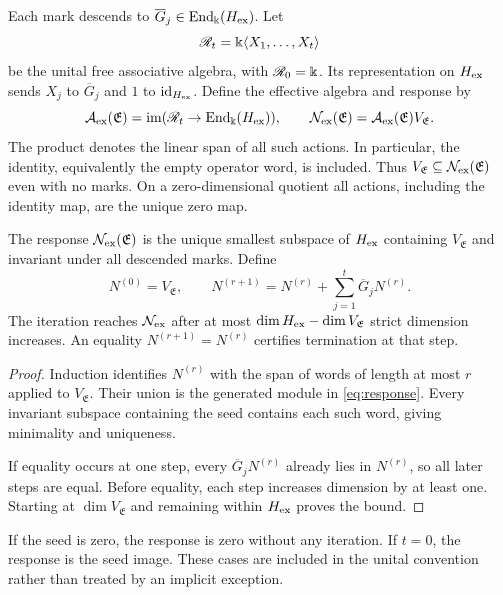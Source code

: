 \documentclass[11pt,a4paper]{article}
\begin{document}
Each mark descends to $\overline G_j\in\operatorname{End}_\Bbbk(H_{\mathrm{ex}})$.  Let
\[
 \mathscr R_t=\Bbbk\langle X_1,\ldots,X_t\rangle
\]
be the unital free associative algebra, with $\mathscr R_0=\Bbbk$.
Its representation on $H_{\mathrm{ex}}$ sends $X_j$ to $\overline G_j$ and
$1$ to $\operatorname{id}_{H_{\mathrm{ex}}}$.  Define the effective algebra and response by
\begin{equation}\label{eq:response}
 \mathcal A_{\mathrm{ex}}(\mathfrak E)=\operatorname{im}(\mathscr R_t\to\operatorname{End}_\Bbbk(H_{\mathrm{ex}})),
 \qquad \mathcal N_{\mathrm{ex}}(\mathfrak E)=\mathcal A_{\mathrm{ex}}(\mathfrak E)V_{\mathfrak E}.
\end{equation}
The product denotes the linear span of all such actions.  In particular,
the identity, equivalently the empty operator word, is included.  Thus
$V_{\mathfrak E}\subseteq\mathcal N_{\mathrm{ex}}(\mathfrak E)$ even with no marks.  On a
zero-dimensional quotient all actions, including the identity map, are
the unique zero map.

\begin{theorem}
\label{thm:closure}
The response $\mathcal N_{\mathrm{ex}}(\mathfrak E)$ is the unique smallest subspace of
$H_{\mathrm{ex}}$ containing $V_{\mathfrak E}$ and invariant under all descended
marks.  Define
\begin{equation}\label{eq:iteration}
 N^{(0)}=V_{\mathfrak E},\qquad
 N^{(r+1)}=N^{(r)}+\sum_{j=1}^t\overline G_jN^{(r)}.
\end{equation}
The iteration reaches $\mathcal N_{\mathrm{ex}}$ after at most
$\dim H_{\mathrm{ex}}-\dim V_{\mathfrak E}$ strict dimension increases.  An equality
$N^{(r+1)}=N^{(r)}$ certifies termination at that step.
\end{theorem}

\begin{proof}
Induction identifies $N^{(r)}$ with the span of words of length at most
$r$ applied to $V_{\mathfrak E}$.  Their union is the generated module
in \cref{eq:response}.  Every invariant subspace containing the seed
contains each such word, giving minimality and uniqueness.

If equality occurs at one step, every $\overline G_jN^{(r)}$ already
lies in $N^{(r)}$, so all later steps are equal.  Before equality, each
step increases dimension by at least one.  Starting at
$\dim V_{\mathfrak E}$ and remaining within $H_{\mathrm{ex}}$ proves the bound.
\end{proof}

If the seed is zero, the response is zero without any iteration.  If
$t=0$, the response is the seed image.  These cases are included in the
unital convention rather than treated by an implicit exception.
\end{document}
